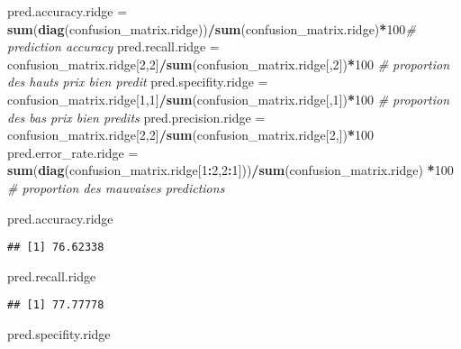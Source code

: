 \documentclass[
]{article}
\newenvironment{Shaded}{\begin{snugshade}}{\end{snugshade}}
\newcommand{\CommentTok}[1]{\textcolor[rgb]{0.56,0.35,0.01}{\textit{#1}}}
\newcommand{\DecValTok}[1]{\textcolor[rgb]{0.00,0.00,0.81}{#1}}
\newcommand{\KeywordTok}[1]{\textcolor[rgb]{0.13,0.29,0.53}{\textbf{#1}}}
\newcommand{\NormalTok}[1]{#1}
\newcommand{\OperatorTok}[1]{\textcolor[rgb]{0.81,0.36,0.00}{\textbf{#1}}}
\newcommand{\StringTok}[1]{\textcolor[rgb]{0.31,0.60,0.02}{#1}}
\begin{document}
\begin{Shaded}
\begin{Highlighting}[]
\NormalTok{pred.accuracy.ridge =}\StringTok{ }\KeywordTok{sum}\NormalTok{(}\KeywordTok{diag}\NormalTok{(confusion_matrix.ridge))}\OperatorTok{/}\KeywordTok{sum}\NormalTok{(confusion_matrix.ridge)}\OperatorTok{*}\DecValTok{100}\CommentTok{#   prediction accuracy}
\NormalTok{pred.recall.ridge =}\StringTok{ }\NormalTok{confusion_matrix.ridge[}\DecValTok{2}\NormalTok{,}\DecValTok{2}\NormalTok{]}\OperatorTok{/}\KeywordTok{sum}\NormalTok{(confusion_matrix.ridge[,}\DecValTok{2}\NormalTok{])}\OperatorTok{*}\DecValTok{100} \CommentTok{# proportion des hauts prix bien predit }
\NormalTok{pred.specifity.ridge =}\StringTok{ }\NormalTok{confusion_matrix.ridge[}\DecValTok{1}\NormalTok{,}\DecValTok{1}\NormalTok{]}\OperatorTok{/}\KeywordTok{sum}\NormalTok{(confusion_matrix.ridge[,}\DecValTok{1}\NormalTok{])}\OperatorTok{*}\DecValTok{100} \CommentTok{# proportion des bas prix bien predits}
\NormalTok{pred.precision.ridge =}\StringTok{ }\NormalTok{confusion_matrix.ridge[}\DecValTok{2}\NormalTok{,}\DecValTok{2}\NormalTok{]}\OperatorTok{/}\KeywordTok{sum}\NormalTok{(confusion_matrix.ridge[}\DecValTok{2}\NormalTok{,])}\OperatorTok{*}\DecValTok{100}
\NormalTok{pred.error_rate.ridge =}
\KeywordTok{sum}\NormalTok{(}\KeywordTok{diag}\NormalTok{(confusion_matrix.ridge[}\DecValTok{1}\OperatorTok{:}\DecValTok{2}\NormalTok{,}\DecValTok{2}\OperatorTok{:}\DecValTok{1}\NormalTok{]))}\OperatorTok{/}\KeywordTok{sum}\NormalTok{(confusion_matrix.ridge) }\OperatorTok{*}\DecValTok{100} \CommentTok{# proportion des mauvaises predictions}

\NormalTok{pred.accuracy.ridge}
\end{Highlighting}
\end{Shaded}

\begin{verbatim}
## [1] 76.62338
\end{verbatim}

\begin{Shaded}
\begin{Highlighting}[]
\NormalTok{pred.recall.ridge}
\end{Highlighting}
\end{Shaded}

\begin{verbatim}
## [1] 77.77778
\end{verbatim}

\begin{Shaded}
\begin{Highlighting}[]
\NormalTok{pred.specifity.ridge}
\end{Highlighting}
\end{Shaded}
\end{document}
